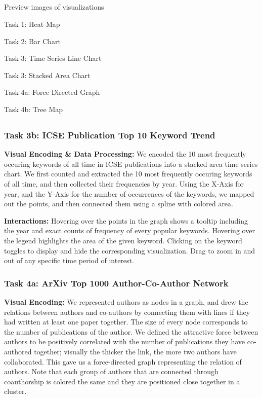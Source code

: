 \documentclass{article}
\begin{document}
\subsection{}

Preview images of visualizations

\caption{Task 1: Heat Map}

\caption{Task 2: Bar Chart}

\caption{Task 3: Time Series Line Chart}

\caption{Task 3: Stacked Area Chart}

\caption{Task 4a: Force Directed Graph}

\caption{Task 4b: Tree Map}

\subsection{}

\subsubsection*{Task 3b: ICSE Publication Top 10 Keyword Trend}


\textbf{Visual Encoding \& Data Processing:} We encoded the 10 most frequently occuring keywords of all time in ICSE publications into a stacked area time series chart. We first counted and extracted the 10 most frequently occuring keywords of all time, and then collected their frequencies by year. Using the X-Axis for year, and the Y-Axis for the number of occurrences of the keywords, we mapped out the points, and then connected them using a spline with colored area.

\textbf{Interactions:} Hovering over the points in the graph shows a tooltip including the year and exact counts of frequency of every popular keywords. Hovering over the legend highlights the area of the given keyword. Clicking on the keyword toggles to display and hide the corresponding visualization. Drag to zoom in and out of any specific time period of interest.

\subsubsection*{Task 4a: ArXiv Top 1000 Author-Co-Author Network}

\textbf{Visual Encoding:} We represented authors as nodes in a graph, and drew the relations between authors and co-authors by connecting them with lines if they had written at least one paper together. The size of every node corresponds to the number of publications of the author. We defined the attractive force between authors to be positively correlated with the number of publications they have co-authored together; visually the thicker the link, the more two authors have collaborated. This gave us a force-directed graph representing the relation of authors. Note that each group of authors that are connected through coauthorship is colored the same and they are positioned close together in a cluster. 
\end{document}
